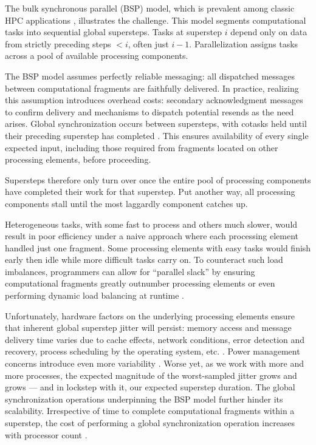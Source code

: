 The bulk synchronous parallel (BSP) model, which is prevalent among classic HPC applications \cite{dongarra2014applied}, illustrates the challenge.
This model segments computational tasks into sequential global supersteps.
Tasks at superstep $i$ depend only on data from strictly preceding steps $<i$, often just $i-1$.
Parallelization assigns tasks across a pool of available processing components.

The BSP model assumes perfectly reliable messaging: all dispatched messages between computational fragments are faithfully delivered.
In practice, realizing this assumption introduces overhead costs: secondary acknowledgment messages to confirm delivery and mechanisms to dispatch potential resends as the need arises.
Global synchronization occurs between supersteps, with cotasks held until their preceding superstep has completed \cite{valiant1990bridging}.
This ensures availability of every single expected input, including those required from fragments located on other processing elements, before proceeding.

Supersteps therefore only turn over once the entire pool of processing components have completed their work for that superstep.
Put another way, all processing components stall until the most laggardly component catches up.

Heterogeneous tasks, with some fast to process and others much slower, would result in poor efficiency under a naive approach where each processing element handled just one fragment.
Some processing elements with easy tasks would finish early then idle while more difficult tasks carry on.
To counteract such load imbalances, programmers can allow for ``parallel slack'' by ensuring computational fragments greatly outnumber processing elements or even performing dynamic load balancing at runtime \cite{valiant1990bridging}.

Unfortunately, hardware factors on the underlying processing elements ensure that inherent global superstep jitter will persist: memory access and message delivery time varies due to cache effects, network conditions, error detection and recovery, process scheduling by the operating system, etc.
\cite{dongarra2014applied}.
Power management concerns introduce even more variability \cite{gropp2013programming}.
Worse yet, as we work with more and more processes, the expected magnitude of the worst-sampled jitter grows and grows --- and in lockstep with it, our expected superstep duration.
The global synchronization operations underpinning the BSP model further hinder its scalability.
Irrespective of time to complete computational fragments within a superstep, the cost of performing a global synchronization operation increases with processor count \cite{dongarra2014applied}.

